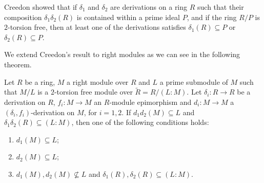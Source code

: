 \documentclass{arxiv}
\begin{document}
Creedon \cite[Theorem 2]{creedon} showed that if $\delta_1$ and $\delta_2$ are derivations on a ring $R$ such that their composition $\delta_1 \delta_2 (R)$ is contained within a prime ideal $P$, and if the ring $R/P$ is $2$-torsion free, then at least one of the derivations satisfies $\delta_1(R) \subseteq P$ or $\delta_2 (R) \subseteq P$. 

We extend Creedon's result to right modules as we can see in the following theorem.
\begin{theorem}\label{teo3.1.2}
    Let $R$ be a ring, $M$ a right module over $R$ and $L$ a prime submodule of $M$ such that $M/L$ is a $2$-torsion free module over $\tilde{R}=R/(L:M)$. Let $\delta_i : R \rightarrow R$ be a derivation on $R$, $f_i: M \rightarrow M$ an $R$-module epimorphism and $d_i:M \rightarrow M$ a $(\delta_i,f_i)$-derivation on $M$, for $i=1,2$. If $d_1d_2(M) \subseteq L$ and $\delta_1\delta_2(R)\subseteq (L:M)$, then one of the following conditions holds:
    \begin{enumerate}
        \item $d_1(M)\subseteq L$;
        \item $d_2(M) \subseteq L$;
        \item $d_1(M), d_2(M) \nsubseteq L$ and $\delta_1(R), \delta_2(R)\subseteq (L:M)$.
    \end{enumerate}
\end{theorem}
\end{document}
